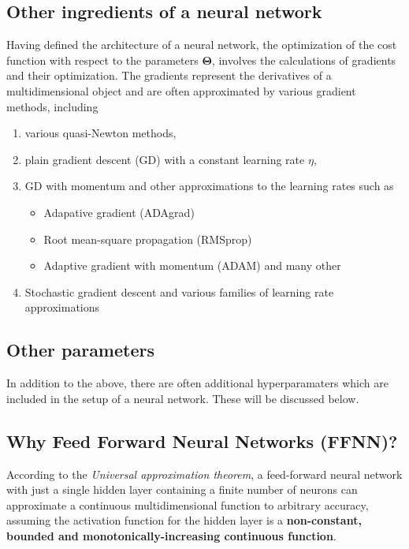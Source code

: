 \documentclass[%
oneside,                 %
final,                   %
10pt]{article}
\begin{document}
\subsection{Other ingredients of a neural network}

Having defined the architecture of a neural network, the optimization
of the cost function with respect to the parameters $\bm{\Theta}$,
involves the calculations of gradients and their optimization. The
gradients represent the derivatives of a multidimensional object and
are often approximated by various gradient methods, including
\begin{enumerate}
\item various quasi-Newton methods,

\item plain gradient descent (GD) with a constant learning rate $\eta$,

\item GD with momentum and other approximations to the learning rates such as
\begin{itemize}

  \item Adapative gradient (ADAgrad)

  \item Root mean-square propagation (RMSprop)

  \item Adaptive gradient with momentum (ADAM) and many other

\end{itemize}

\noindent
\item Stochastic gradient descent and various families of learning rate approximations
\end{enumerate}

\noindent
\subsection{Other parameters}

In addition to the above, there are often additional hyperparamaters
which are included in the setup of a neural network. These will be
discussed below.

\subsection{Why Feed Forward Neural Networks (FFNN)?}

According to the \emph{Universal approximation theorem}, a feed-forward
neural network with just a single hidden layer containing a finite
number of neurons can approximate a continuous multidimensional
function to arbitrary accuracy, assuming the activation function for
the hidden layer is a \textbf{non-constant, bounded and
monotonically-increasing continuous function}.
\end{document}
